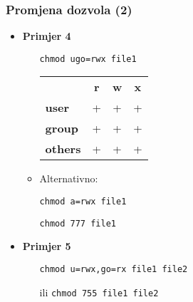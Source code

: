 \documentclass[table,usenames,dvipsnames]{beamer}
\newcommand{\shell}[1]{\texttt{#1}}
\begin{document}
\begin{frame}[t]
\frametitle{Promjena dozvola (2)}
\begin{itemize}
  \item \textbf{Primjer 4}
  \begin{itemize}
    \item[] \shell{chmod ugo=rwx file1}
    \item[] \hspace{1em} \begin{tabular}{l c c c}
    	& \textbf{r} & \textbf{w} & \textbf{x}\\
    	\textbf{user} & + & + & +\\
    	\textbf{group} & + & + & +\\
    	\textbf{others} & + & + & +
    \end{tabular}
    \item \vspace{1em} Alternativno:
    \item[] \shell{chmod a=rwx file1}
    \item[] \shell{chmod 777 file1}
  \end{itemize}
\end{itemize}
\begin{itemize}
	\item \textbf{Primjer 5}
    \begin{itemize}
	    \item[] \shell{chmod u=rwx,go=rx file1 file2}
	    \item[ili] \shell{chmod 755 file1 file2}
	\end{itemize}
\end{itemize}
\end{frame}
\end{document}
